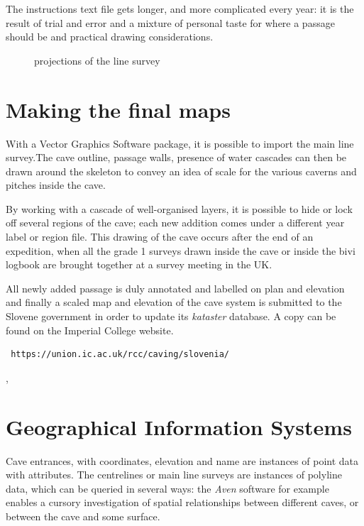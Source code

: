 The instructions text file gets longer, and more complicated every year: it is the result of trial and error and a mixture of personal taste for where a passage should be and practical drawing considerations. 

\begin{figure}[t!]
 \checkoddpage \ifoddpage \forcerectofloat \else \forceversofloat \fi
\centering
{}
\caption{projections of the line survey}
\label{projection}
\end{figure}


\section{Making the final maps}
With a Vector Graphics Software package, it is possible to import the main line survey.The cave outline, passage walls, presence of water cascades can then be drawn around the skeleton to convey an idea of scale for the various caverns and pitches inside the cave.



By working with a cascade of well-organised layers, it is possible to hide or lock off several regions of the cave; each new addition comes under a different year label or region file. This drawing of the cave occurs after the end of an expedition, when all the grade 1 surveys drawn inside the cave or inside the bivi logbook are brought together at a survey meeting in the UK.

All newly added passage is duly annotated and labelled on plan and elevation and finally a scaled map and elevation of the cave system is submitted to the Slovene government in order to update its \emph{kataster} database. A copy can be found on the Imperial College website. \begin{verbatim} https://union.ic.ac.uk/rcc/caving/slovenia/  \end{verbatim},



\section{Geographical Information Systems}

Cave entrances, with coordinates, elevation and name are instances of point data with attributes. The centrelines or main line surveys are instances of polyline data, which can be queried in several ways: the \emph{Aven} software for example enables a cursory investigation of spatial relationships between different caves, or between the cave and some surface.

